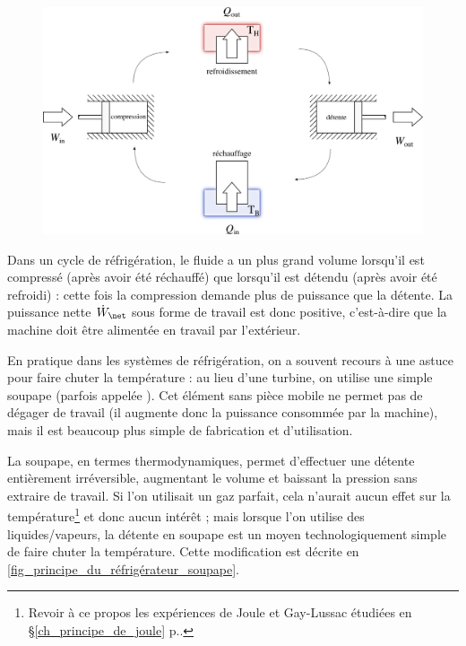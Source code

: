 			\begin{figure}
				\begin{center}
					\includegraphics[width=\textwidth]{images/refrigerateur_climatiseur_thermopompe_sf.png}
				\end{center}
				\label{fig_refrigerateur_climatiseur_thermopompe_sf}
			\end{figure}

			Dans un cycle de réfrigération, le fluide a un plus grand volume lorsqu’il est compressé (après avoir été réchauffé) que lorsqu’il est détendu (après avoir été refroidi) : cette fois la compression demande plus de puissance que la détente. La puissance nette $\dot W_\net$ sous forme de travail est donc positive, c’est-à-dire que la machine doit être alimentée en travail par l’extérieur.

			En pratique dans les systèmes de réfrigération, on a souvent recours à une astuce pour faire chuter la température : au lieu d’une turbine, on utilise une simple soupape (parfois appelée ). Cet élément sans pièce mobile ne permet pas de dégager de travail (il augmente donc la puissance consommée par la machine), mais il est beaucoup plus simple de fabrication et d’utilisation.

			La soupape, en termes thermodynamiques, permet d’effectuer une détente entièrement irréversible, augmentant le volume et baissant la pression sans extraire de travail. Si l’on utilisait un gaz parfait, cela n’aurait aucun effet sur la température\footnote{Revoir à ce propos les expériences de Joule et Gay-Lussac étudiées en \S\ref{ch_principe_de_joule} p.\pageref{ch_principe_de_joule}.} et donc aucun intérêt ; mais lorsque l’on utilise des liquides/vapeurs, la détente en soupape est un moyen technologiquement simple de faire chuter la température. Cette modification est décrite en \cref{fig_principe_du_réfrigérateur_soupape}.


